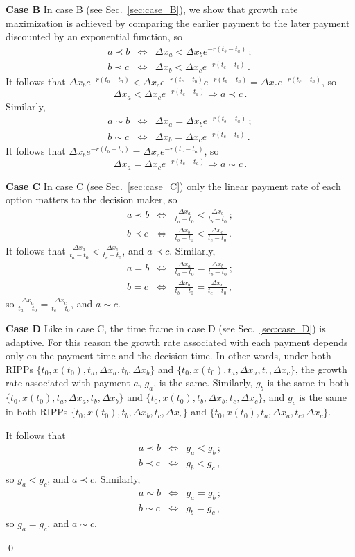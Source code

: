 \documentclass[11pt]{article}
\newcommand{\sref}[1]{Sec.~\ref{sec:#1}}
\newcommand{\be}{\begin{equation}}
\newcommand{\ee}{\end{equation}}
\newcommand{\bea}{\begin{eqnarray}}
\newcommand{\eea}{\end{eqnarray}}
\newcommand{\Dx}{\Delta x}
\newcommand{\subhead}[1]{\mbox{}\newline\textbf{#1}\newline}
\numberwithin{equation}{section}
\begin{document}
\subhead{Case B}
In case B (see \sref{case_B}), we show that growth rate maximization is achieved by comparing the earlier payment to the later payment discounted by an exponential function, so
%
\bea
a \prec b &\iff& \Dx_a < \Dx_b e^{-r\left(t_b - t_a\right)}\,;\\
b \prec c &\iff& \Dx_b < \Dx_c e^{-r\left(t_c - t_b\right)}\,.
\eea
%
It follows that $\Dx_b e^{-r\left(t_b - t_a\right)} < \Dx_c e^{-r\left(t_c - t_b\right)} e^{-r\left(t_b - t_a\right)} = \Dx_c e^{-r\left(t_c - t_a\right)}$, so
%
\be
\Dx_a < \Dx_c e^{-r\left(t_c - t_a\right)} \Longrightarrow a \prec c\,.
\ee
%
Similarly,
%
\bea
a \sim b &\iff& \Dx_a = \Dx_b e^{-r\left(t_b - t_a\right)}\,;\\
b \sim c &\iff& \Dx_b = \Dx_c e^{-r\left(t_c - t_b\right)}\,.
\eea
%
It follows that $\Dx_b e^{-r\left(t_b - t_a\right)} = \Dx_c e^{-r\left(t_c - t_a\right)}$, so
%
\be
\Dx_a = \Dx_c e^{-r\left(t_c - t_a\right)} \Longrightarrow a \sim c\,.
\ee

\subhead{Case C}
In case C (see \sref{case_C}) only the linear payment rate of each option matters to the decision maker, so
%
\bea
a \prec b &\iff& \frac{\Dx_a}{t_a - t_0} < \frac{\Dx_b}{t_b - t_0}\,;\\
b \prec c &\iff& \frac{\Dx_b}{t_b - t_0} < \frac{\Dx_c}{t_c - t_0}\,.
\eea
%
It follows that $\frac{\Dx_a}{t_a - t_0} < \frac{\Dx_c}{t_c - t_0}$, and $a \prec c$. Similarly,
%
\bea
a = b &\iff& \frac{\Dx_a}{t_a - t_0} = \frac{\Dx_b}{t_b - t_0}\,;\\
b = c &\iff& \frac{\Dx_b}{t_b - t_0} = \frac{\Dx_c}{t_c - t_0}\,,
\eea
%
so $\frac{\Dx_a}{t_a - t_0} = \frac{\Dx_c}{t_c - t_0}$, and $a \sim c$.

\subhead{Case D}
Like in case C, the time frame in case D (see \sref{case_D}) is adaptive. For this reason the growth rate associated with each payment depends only on the payment time and the decision time. In other words, under both RIPPs $\{t_0,x\left(t_0\right),t_a,\Dx_a,t_b,\Dx_b\}$ and $\{t_0,x\left(t_0\right),t_a,\Dx_a,t_c,\Dx_c\}$, the growth rate associated with payment $a$, $g_a$, is the same. Similarly, $g_b$ is the same in both $\{t_0,x\left(t_0\right),t_a,\Dx_a,t_b,\Dx_b\}$ and $\{t_0,x\left(t_0\right),t_b,\Dx_b,t_c,\Dx_c\}$, and $g_c$ is the same in both RIPPs $\{t_0,x\left(t_0\right),t_b,\Dx_b,t_c,\Dx_c\}$ and $\{t_0,x\left(t_0\right),t_a,\Dx_a,t_c,\Dx_c\}$.

It follows that
%
\bea
a \prec b &\iff& g_a < g_b\,;\\
b \prec c &\iff& g_b < g_c\,,
\eea
%
so $g_a < g_c$, and $a \prec c$. Similarly,
%
\bea
a \sim b &\iff& g_a = g_b\,;\\
b \sim c &\iff& g_b = g_c\,,
\eea
%
so $g_a = g_c$, and $a \sim c$.

\qed
\end{document}
